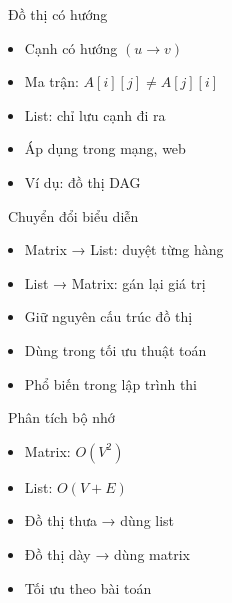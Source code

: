 \documentclass{beamer}
\begin{document}
\begin{frame}{\faArrowRight\ Đồ thị có hướng}
\begin{tcolorbox}
\begin{itemize}
\item Cạnh có hướng $(u \rightarrow v)$
\item Ma trận: $A[i][j] \neq A[j][i]$
\item List: chỉ lưu cạnh đi ra
\item Áp dụng trong mạng, web
\item Ví dụ: đồ thị DAG
\end{itemize}
\end{tcolorbox}

\vspace{0.3cm}

\begin{center}
\end{center}

\end{frame}
\begin{frame}{\faExchangeAlt\ Chuyển đổi biểu diễn}
\begin{tcolorbox}
\begin{itemize}
\item Matrix → List: duyệt từng hàng
\item List → Matrix: gán lại giá trị
\item Giữ nguyên cấu trúc đồ thị
\item Dùng trong tối ưu thuật toán
\item Phổ biến trong lập trình thi
\end{itemize}
\end{tcolorbox}
\end{frame}

\begin{frame}{\faMemory\ Phân tích bộ nhớ}
\begin{tcolorbox}
\begin{itemize}
\item Matrix: $O(V^2)$
\item List: $O(V+E)$
\item Đồ thị thưa → dùng list
\item Đồ thị dày → dùng matrix
\item Tối ưu theo bài toán
\end{itemize}
\end{tcolorbox}
\end{frame}
\end{document}
